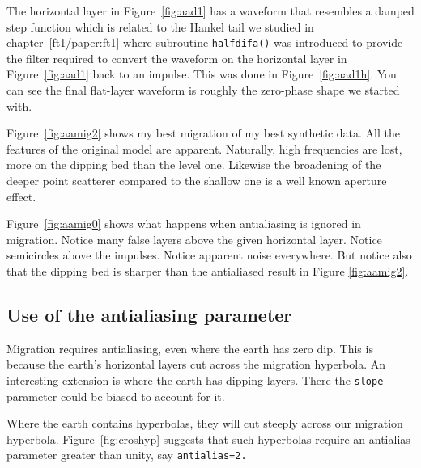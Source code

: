\par
The horizontal layer in Figure~\ref{fig:aad1}
has a waveform that resembles a damped step function
which is related to the Hankel tail we studied in chapter~\ref{ft1/paper:ft1}
where subroutine \texttt{halfdifa()}  was introduced
to provide the filter required to convert
the waveform on the  horizontal layer in Figure~\ref{fig:aad1} back to an impulse.
This was done in Figure~\ref{fig:aad1h}.
You can see the final flat-layer waveform
is roughly the zero-phase shape we started with.

Figure~\ref{fig:aamig2} shows my best migration of my best synthetic data.
All the features of the original model are apparent.
Naturally, high frequencies are lost,
more on the dipping bed than the level one.  
Likewise the broadening of the deeper point scatterer compared
to the shallow one is a well known aperture effect.


Figure~\ref{fig:aamig0} shows what happens when antialiasing
is ignored in migration.
Notice many false layers above the given horizontal layer.
Notice semicircles above the impulses.
Notice apparent noise everywhere.
But notice also that the dipping bed is sharper
than the antialiased result in Figure \ref{fig:aamig2}.

\subsection{Use of the antialiasing parameter}

\par
Migration requires antialiasing, even where the earth has zero dip.
This is because the earth's horizontal layers
cut across the migration hyperbola.
An interesting extension is where the earth has dipping layers.
There the {\tt slope} parameter could be biased to account for it.
\par
Where the earth contains hyperbolas,
they will cut steeply across our migration hyperbola.
Figure~\ref{fig:croshyp} suggests
that such hyperbolas require
an antialias parameter greater than unity, say {\tt antialias=2.}

